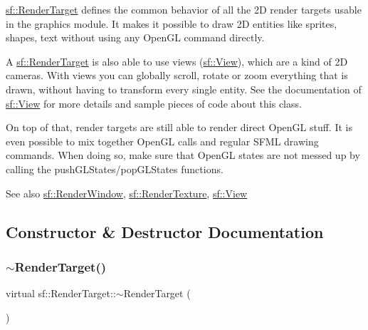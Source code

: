 \begin{DoxyVerb}\end{DoxyVerb}


\mbox{\hyperlink{classsf_1_1_render_target}{sf\+::\+Render\+Target}} defines the common behavior of all the 2D render targets usable in the graphics module. It makes it possible to draw 2D entities like sprites, shapes, text without using any Open\+GL command directly.

A \mbox{\hyperlink{classsf_1_1_render_target}{sf\+::\+Render\+Target}} is also able to use views (\mbox{\hyperlink{classsf_1_1_view}{sf\+::\+View}}), which are a kind of 2D cameras. With views you can globally scroll, rotate or zoom everything that is drawn, without having to transform every single entity. See the documentation of \mbox{\hyperlink{classsf_1_1_view}{sf\+::\+View}} for more details and sample pieces of code about this class.

On top of that, render targets are still able to render direct Open\+GL stuff. It is even possible to mix together Open\+GL calls and regular S\+F\+ML drawing commands. When doing so, make sure that Open\+GL states are not messed up by calling the push\+G\+L\+States/pop\+G\+L\+States functions.

\begin{DoxySeeAlso}{See also}
\mbox{\hyperlink{classsf_1_1_render_window}{sf\+::\+Render\+Window}}, \mbox{\hyperlink{classsf_1_1_render_texture}{sf\+::\+Render\+Texture}}, \mbox{\hyperlink{classsf_1_1_view}{sf\+::\+View}} \begin{DoxyVerb}\end{DoxyVerb}
 
\end{DoxySeeAlso}


\subsection{Constructor \& Destructor Documentation}
\mbox{\label{classsf_1_1_render_target_a9abd1654a99fba46f6887b9c625b9b06}} 
\subsubsection{\texorpdfstring{$\sim$RenderTarget()}{~RenderTarget()}}
{\footnotesize\ttfamily virtual sf\+::\+Render\+Target\+::$\sim$\+Render\+Target (\begin{DoxyParamCaption}{ }\end{DoxyParamCaption})\hspace{0.3cm}{\ttfamily [virtual]}}



